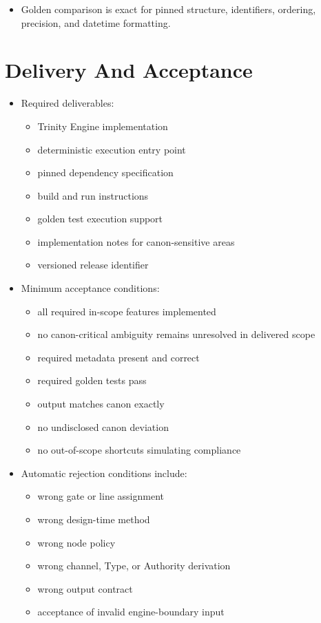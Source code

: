 \documentclass[11pt]{article}
\begin{document}
\begin{itemize}
\begin{itemize}
\item line interval ownership
\item design-time derivation
\item channel deduplication
\item center definition logic
\item definition assignment
\item type priority
\item authority priority
\item rejected old gate anchor assumptions
\end{itemize}
\item Golden comparison is exact for pinned structure, identifiers, ordering, precision, and datetime formatting.
\end{itemize}
\section{Delivery And Acceptance}
\label{sec:orgbb59167}
\begin{itemize}
\item Required deliverables:
\begin{itemize}
\item Trinity Engine implementation
\item deterministic execution entry point
\item pinned dependency specification
\item build and run instructions
\item golden test execution support
\item implementation notes for canon-sensitive areas
\item versioned release identifier
\end{itemize}
\item Minimum acceptance conditions:
\begin{itemize}
\item all required in-scope features implemented
\item no canon-critical ambiguity remains unresolved in delivered scope
\item required metadata present and correct
\item required golden tests pass
\item output matches canon exactly
\item no undisclosed canon deviation
\item no out-of-scope shortcuts simulating compliance
\end{itemize}
\item Automatic rejection conditions include:
\begin{itemize}
\item wrong gate or line assignment
\item wrong design-time method
\item wrong node policy
\item wrong channel, Type, or Authority derivation
\item wrong output contract
\item acceptance of invalid engine-boundary input
\end{itemize}
\end{itemize}
\end{document}
